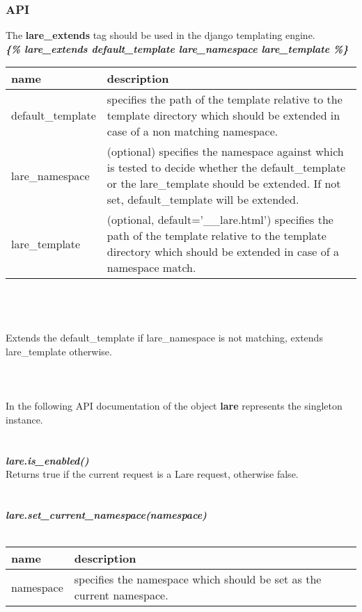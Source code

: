 \subsubsection{API}
The \textbf{lare\_extends} tag should be used in the django templating engine.
\\
\large{\textbf{\textit{\{\% lare\_extends default\_template lare\_namespace lare\_template \%\}}}}
\\
\begin{tabular}{|p{4cm}|p{9cm}|}
    \hline
    \textbf{name} & \textbf{description} \\
    \hline
    default\_template & specifies the path of the template relative to the template directory which should be extended in case of a non matching namespace. \\
    \hline
    lare\_namespace & (optional) specifies the namespace against which is tested to decide whether the default\_template or the lare\_template should be extended. If not set, default\_template will be extended. \\
    \hline
    lare\_template & (optional, default='\_\_lare.html') specifies the path of the template relative to the template directory which should be extended in case of a name\-space match. \\
    \hline
\end{tabular}
\\
\\
\\
Extends the default\_template if lare\_namespace is not matching, extends lare\_template otherwise.
\\
\\
\\
\\
In the following API documentation of the \textbf{\lare{}} object \textbf{lare} represents the singleton instance.
\\
\\
\\
\large{\textbf{\textit{lare.is\_enabled()}}}
\\
Returns true if the current request is a Lare request, otherwise false.
\\
\\
\\
\large{\textit{\textbf{lare.set\_current\_namespace(namespace)}}}
\\
\\
\begin{tabular}{|p{4cm}|p{9cm}|}
    \hline
    \textbf{name} & \textbf{description} \\
    \hline
    namespace & specifies the namespace which should be set as the current namespace. \\
    \hline
\end{tabular}
